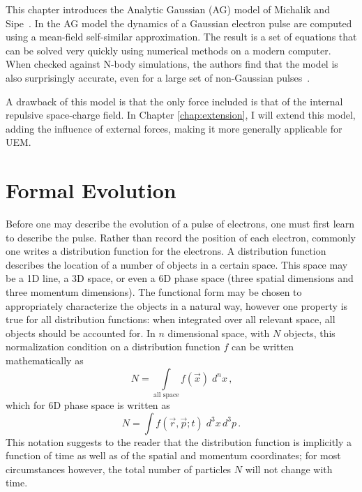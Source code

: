 
This chapter introduces the Analytic Gaussian (AG) model of Michalik and Sipe~\cite{michalik_analytic_2006}.
In the AG model the dynamics of a Gaussian electron pulse are computed using a mean-field self-similar approximation.
The result is a set of equations that can be solved very quickly using numerical methods on a modern computer.
When checked against N-body simulations, the authors find that the model is also surprisingly accurate, even for a large set of non-Gaussian pulses~\cite{michalik_analytic_2006,michalik_evolution_2009}.

A drawback of this model is that the only force included is that of the internal repulsive space-charge field.
In Chapter \ref{chap:extension}, I will extend this model, adding the influence of external forces, making it more generally applicable for UEM.

\section{Formal Evolution} \label{sec:formal_evolution}

Before one may describe the evolution of a pulse of electrons, one must first learn to describe the pulse.
Rather than record the position of each electron, commonly one writes a distribution function for the electrons.
A distribution function describes the location of a number of objects in a certain space.
This space may be a 1D line, a 3D space, or even a 6D phase space (three spatial dimensions and three momentum dimensions).
The functional form may be chosen to appropriately characterize the objects in a natural way, however one property is true for all distribution functions: when integrated over all relevant space, all objects should be accounted for.
In $n$ dimensional space, with $N$ objects, this normalization condition on a distribution function $f$ can be written mathematically as
\begin{equation}
  N = \int\limits_{\text{all space}} \!\!\! f(\vec{x}) \; d^{n}x \,\text{,}
\end{equation}
which for 6D phase space is written as
\begin{equation} \label{eq:normalization}
  N = \int f (\vec{r}, \vec{p}; t) \; d^{3}x\,d^{3}p \,\text{.}
\end{equation}
This notation suggests to the reader that the distribution function is implicitly a function of time as well as of the spatial and momentum coordinates; for most circumstances however, the total number of particles $N$ will not change with time.

